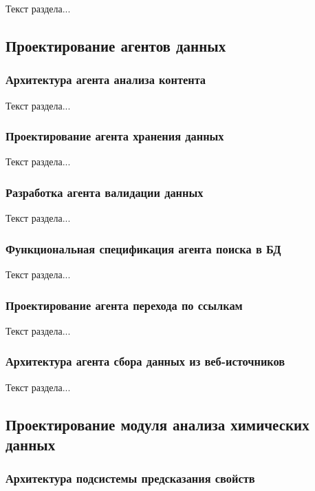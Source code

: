 Текст раздела...

\subsection{Проектирование агентов данных}

\subsubsection{Архитектура агента анализа контента}

Текст раздела...

\subsubsection{Проектирование агента хранения данных}

Текст раздела...

\subsubsection{Разработка агента валидации данных}

Текст раздела...

\subsubsection{Функциональная спецификация агента поиска в БД}

Текст раздела...

\subsubsection{Проектирование агента перехода по ссылкам}

Текст раздела...

\subsubsection{Архитектура агента сбора данных из веб-источников}

Текст раздела...

\subsection{Проектирование модуля анализа химических данных}

\subsubsection{Архитектура подсистемы предсказания свойств}

